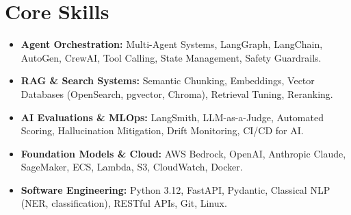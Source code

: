 \documentclass[a4paper,10pt]{article}
\begin{document}
\section{Core Skills}
\begin{itemize}
  \item \textbf{Agent Orchestration:} Multi-Agent Systems, LangGraph, LangChain, AutoGen, CrewAI, Tool Calling, State Management, Safety Guardrails.
  \item \textbf{RAG \& Search Systems:} Semantic Chunking, Embeddings, Vector Databases (OpenSearch, pgvector, Chroma), Retrieval Tuning, Reranking.
  \item \textbf{AI Evaluations \& MLOps:} LangSmith, LLM-as-a-Judge, Automated Scoring, Hallucination Mitigation, Drift Monitoring, CI/CD for AI.
  \item \textbf{Foundation Models \& Cloud:} AWS Bedrock, OpenAI, Anthropic Claude, SageMaker, ECS, Lambda, S3, CloudWatch, Docker.
  \item \textbf{Software Engineering:} Python 3.12, FastAPI, Pydantic, Classical NLP (NER, classification), RESTful APIs, Git, Linux.
\end{itemize}
\end{document}
